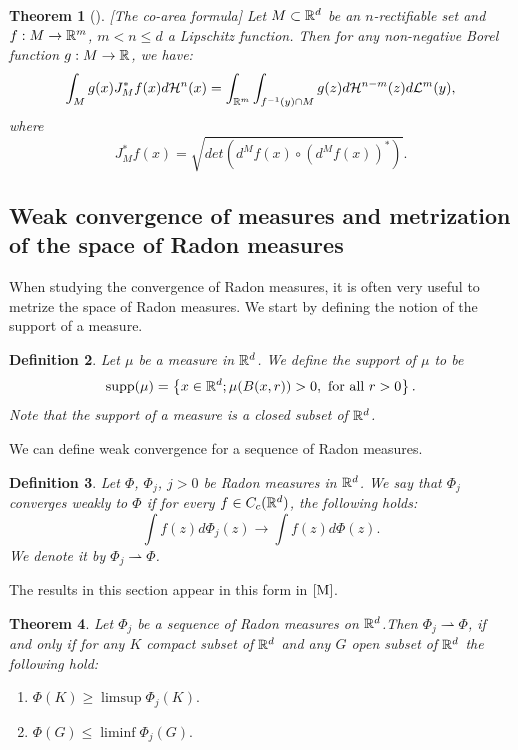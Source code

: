 \documentclass[11pt]{article}
\newtheorem{theorem}{Theorem}[section]
\newtheorem{definition}[theorem]{Definition}
\theoremstyle{definition}
\theoremstyle{remark}
\numberwithin{equation}{section}
\begin{document}
 

 
\begin{theorem}[\cite{S}][The co-area formula]
Let $M \subset \mathbb{R}^d$ be an $n$-rectifiable set and $f: M \rightarrow \mathbb{R}^{m}$, $m < n \leq d$  a Lipschitz function. Then for any non-negative Borel function $g:M \rightarrow \mathbb{R}$, we have:
\begin{equation}\label{coarea}
\int_{M} g(x) J_{M}^{*}f (x)d\mathcal{H}^{n} (x) = \int_{\mathbb{R}^{m}} \int_{f^{-1}(y) \cap M} g(z) d\mathcal{H}^{n-m}(z) d\mathcal{L}^{m}(y),
\end{equation}
where 
\begin{equation}
 J_{M}^{*}f(x)= \sqrt{det(d^{M}f(x) \circ (d^{M}f(x))^{*} ) }.
\end{equation}
\end{theorem}
\subsection{Weak convergence of measures and metrization of the space of Radon measures}
When studying the convergence of Radon measures, it is often very useful to metrize the space of Radon measures. We start by defining the notion of the support of a measure.
\begin{definition}
Let $\mu$ be a measure in $\mathbb{R}^{d}$. We define the support of $\mu$ to be 
\begin{equation}
\mbox{supp}(\mu)=\left\lbrace x \in \mathbb{R}^{d} ; \mu(B(x,r))>0, \mbox{ for all } r>0 \right\rbrace. 
\end{equation}
Note that the support of a measure is a closed subset of $\mathbb{R}^{d}$.
\end{definition}
We can define weak convergence for a sequence of Radon measures.
\begin{definition}
Let $\Phi$, $\Phi_j$, $j>0$ be Radon measures in $\mathbb{R}^{d}$.
We say that $\Phi_j$ converges weakly to $\Phi$ if for every $f \in C_{c}(\mathbb{R}^{d})$, the following holds:
\begin{equation}
\int f(z) d\Phi_j (z) \to \int f(z) d\Phi(z).
\end{equation} 
We denote it by $ \Phi_j \rightharpoonup \Phi$.
\end{definition}
The results in this section appear in this form in $\cite{M}$.
\begin{theorem}
Let $\Phi_j$ be a sequence of Radon measures on $\mathbb{R}^{d}$.Then $\Phi_j \rightharpoonup \Phi$, if and only if for any $K$ compact subset of $\mathbb{R}^{d}$ and any $G$ open subset of $\mathbb{R}^{d}$ the following hold:
\begin{enumerate}
\item $\Phi(K) \geq \limsup \Phi_{j}(K).$
\item $\Phi(G) \leq \liminf \Phi_{j}(G).$
\end{enumerate}

\end{theorem}
\end{document}

